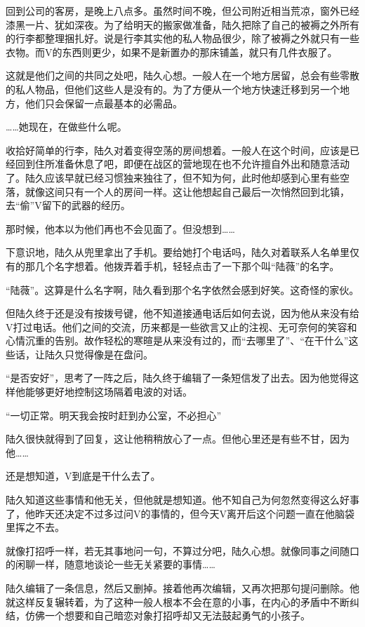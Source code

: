 回到公司的客房，是晚上八点多。虽然时间不晚，但公司附近相当荒凉，窗外已经漆黑一片、犹如深夜。为了给明天的搬家做准备，陆久把除了自己的被褥之外所有的行李都整理捆扎好。说是行李其实他的私人物品很少，除了被褥之外就只有一些衣物。而V的东西则更少，如果不是新置办的那床铺盖，就只有几件衣服了。

这就是他们之间的共同之处吧，陆久心想。一般人在一个地方居留，总会有些零散的私人物品，但他们这些人是没有的。为了方便从一个地方快速迁移到另一个地方，他们只会保留一点最基本的必需品。

……她现在，在做些什么呢。

收拾好简单的行李，陆久对着变得空荡的房间想着。一般人在这个时间，应该是已经回到住所准备休息了吧，即便在战区的营地现在也不允许擅自外出和随意活动了。陆久应该早就已经习惯独来独往了，但不知为何，此时他却感到心里有些空落，就像这间只有一个人的房间一样。这让他想起自己最后一次悄然回到北镇，去“偷”V留下的武器的经历。

那时候，他本以为他们再也不会见面了。但没想到……

下意识地，陆久从兜里拿出了手机。要给她打个电话吗，陆久对着联系人名单里仅有的那几个名字想着。他拨弄着手机，轻轻点击了一下那个叫“陆薇”的名字。

“陆薇”。这算是什么名字啊，陆久看到那个名字依然会感到好笑。这奇怪的家伙。

但陆久终于还是没有按拨号键，他不知道接通电话后如何去说，因为他从来没有给V打过电话。他们之间的交流，历来都是一些欲言又止的注视、无可奈何的笑容和心情沉重的告别。故作轻松的寒暄是从来没有过的，而“去哪里了”、“在干什么”这些话，让陆久只觉得像是在盘问。

“是否安好”，思考了一阵之后，陆久终于编辑了一条短信发了出去。因为他觉得这样他能够更好地控制这场隔着电波的对话。

“一切正常。明天我会按时赶到办公室，不必担心”

陆久很快就得到了回复，这让他稍稍放心了一点。但他心里还是有些不甘，因为他……

还是想知道，V到底是干什么去了。

陆久知道这些事情和他无关，但他就是想知道。他不知自己为何忽然变得这么好事了，他昨天还决定不过多过问V的事情的，但今天V离开后这个问题一直在他脑袋里挥之不去。

就像打招呼一样，若无其事地问一句，不算过分吧，陆久心想。就像同事之间随口的闲聊一样，随意地谈论一些无关紧要的事情……

陆久编辑了一条信息，然后又删掉。接着他再次编辑，又再次把那句提问删除。他就这样反复辗转着，为了这种一般人根本不会在意的小事，在内心的矛盾中不断纠结，仿佛一个想要和自己暗恋对象打招呼却又无法鼓起勇气的小孩子。

